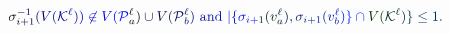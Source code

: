 \documentclass[12pt]{article}
\begin{document}
\makeatletter
\renewcommand*{\@textcolor}[3]{%
  \protect\leavevmode
  \begingroup
    \color#1{#2}#3%
  \endgroup
}
\makeatother
\begin{displaymath}
\mathcolor[RGB]{0,0,15}{\sigma} _ { \mathcolor[RGB]{0,0,30}{i} \mathcolor[RGB]{0,0,45}{+} \mathcolor[RGB]{0,0,60}{1} } ^ { \mathcolor[RGB]{0,0,75}{-} \mathcolor[RGB]{0,0,90}{1} } \mathcolor[RGB]{0,0,105}{(} \mathcolor[RGB]{0,0,120}{V} \mathcolor[RGB]{0,0,135}{(} \mathcal { \mathcolor[RGB]{0,0,150}{K} } ^ { \mathcolor[RGB]{0,0,165}{\ell} } \mathcolor[RGB]{0,0,180}{)} \mathcolor[RGB]{0,0,195}{)} \mathcolor[RGB]{0,0,210}{\not\in} \mathcolor[RGB]{0,0,225}{V} \mathcolor[RGB]{0,0,240}{(} \mathcal { \mathcolor[RGB]{0,0,255}{P} } _ { \mathcolor[RGB]{0,15,0}{a} } ^ { \mathcolor[RGB]{0,15,15}{\ell} } \mathcolor[RGB]{0,15,30}{)} \mathcolor[RGB]{0,15,45}{\cup} \mathcolor[RGB]{0,15,60}{V} \mathcolor[RGB]{0,15,75}{(} \mathcal { \mathcolor[RGB]{0,15,90}{P} } _ { \mathcolor[RGB]{0,15,105}{b} } ^ { \mathcolor[RGB]{0,15,120}{\ell} } \mathcolor[RGB]{0,15,135}{)} \mathrm { ~ \mathcolor[RGB]{0,15,150}{a} \mathcolor[RGB]{0,15,165}{n} \mathcolor[RGB]{0,15,180}{d} ~ } \mathcolor[RGB]{0,15,195}{\vert} \mathcolor[RGB]{0,15,210}{\{} \mathcolor[RGB]{0,15,225}{\sigma} _ { \mathcolor[RGB]{0,15,240}{i} \mathcolor[RGB]{0,15,255}{+} \mathcolor[RGB]{0,30,0}{1} } \mathcolor[RGB]{0,30,15}{(} \mathcolor[RGB]{0,30,30}{v} _ { \mathcolor[RGB]{0,30,45}{a} } ^ { \mathcolor[RGB]{0,30,60}{\ell} } \mathcolor[RGB]{0,30,75}{)} \mathcolor[RGB]{0,30,90}{,} \mathcolor[RGB]{0,30,105}{\sigma} _ { \mathcolor[RGB]{0,30,120}{i} \mathcolor[RGB]{0,30,135}{+} \mathcolor[RGB]{0,30,150}{1} } \mathcolor[RGB]{0,30,165}{(} \mathcolor[RGB]{0,30,180}{v} _ { \mathcolor[RGB]{0,30,195}{b} } ^ { \mathcolor[RGB]{0,30,210}{\ell} } \mathcolor[RGB]{0,30,225}{)} \mathcolor[RGB]{0,30,240}{\}} \mathcolor[RGB]{0,30,255}{\cap} \mathcolor[RGB]{0,45,0}{V} \mathcolor[RGB]{0,45,15}{(} \mathcal { \mathcolor[RGB]{0,45,30}{K} } ^ { \mathcolor[RGB]{0,45,45}{\ell} } \mathcolor[RGB]{0,45,60}{)} \mathcolor[RGB]{0,45,75}{\}} \mathcolor[RGB]{0,45,90}{\leq} \mathcolor[RGB]{0,45,105}{1} \mathcolor[RGB]{0,45,120}{.}
\end{displaymath}
\end{document}
